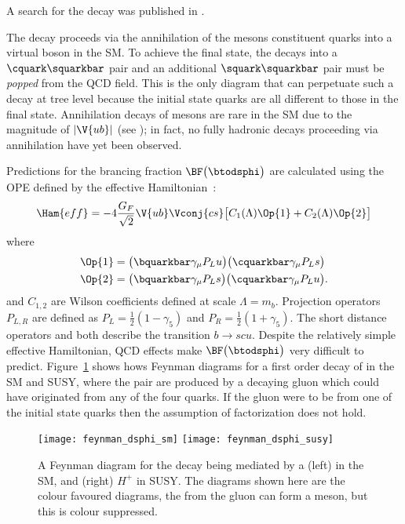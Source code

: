A search for the decay \btodsphi was published in .

The decay \btodsphi proceeds via the annihilation of the \Bp mesons constituent quarks into
a virtual \Wp boson in the SM.
To achieve the final state, the \Wp decays into a $\cquark\squarkbar$ pair and an additional
$\squark\squarkbar$ pair must be \emph{popped} from the QCD field.
This is the only diagram that can perpetuate such a decay at tree level because the initial state
quarks are all different to those in the final state.
Annihilation decays of \Bp mesons are rare in the SM due to the magnitude of $|\V{ub}|$ (see
); in fact, no fully hadronic decays proceeding via annihilation have yet been
observed.


Predictions for the brancing fraction $\BF\big(\btodsphi\big)$ are calculated using the OPE defined
by the effective Hamiltonian~\cite{Zou:2009zza,Mohanta:2002wf,PhysRevD.76.057701,Lu:2001yz}:
\begin{equation}
  \Ham{eff}=
  -4\frac{G_F}{\sqrt{2}} \V{ub}\Vconj{cs}
  \big[
    C_1(\Lambda)\Op{1}+C_2(\Lambda)\Op{2}
    \big]
\end{equation}
where
\begin{align}
  \Op{1} &= \big(\bquarkbar\gamma_\mu P_Lu\big) \big(\cquarkbar\gamma_\mu P_Ls\big) \nonumber\\
  \Op{2} &= \big(\bquarkbar\gamma_\mu P_Ls\big) \big(\cquarkbar\gamma_\mu P_Lu\big).
\end{align}
and $C_{1,2}$ are Wilson coefficients defined at scale $\Lambda=m_b$.
Projection operators $P_{L,R}$ are defined as $P_L=\tfrac12(1-\gamma_5)$ and
$P_R=\tfrac12(1+\gamma_5)$.
The short distance operators  and  both describe the transition $b\!\to scu$.
Despite the relatively simple effective Hamiltonian, QCD effects make $\BF\big(\btodsphi\big)$ very
difficult to predict.
Figure~\ref{fig:dsphi:feyn} shows hows Feynman diagrams for a first order decay of \btodsphi in the
SM and SUSY, where the \ssbar pair are produced by a decaying gluon which could have
originated from any of the four quarks.
If the gluon were to be from one of the initial state quarks then the assumption of factorization
does not hold.


\begin{figure}
  \begin{center}
    \texttt{[image: feynman\_dsphi\_sm]}
    \texttt{[image: feynman\_dsphi\_susy]}
    \caption[Feynman diagram for the decay \btodsphi]
    {\small
      A Feynman diagram for the decay \btodsphi being mediated by a
      (left) \Wp in the SM, and
      (right) $H^+$ in SUSY.
      The diagrams shown here are the colour favoured diagrams, the \ssbar from the gluon can form
      a \phii meson, but this is colour suppressed.
    }
    \label{fig:dsphi:feyn}
  \end{center}
\end{figure}


